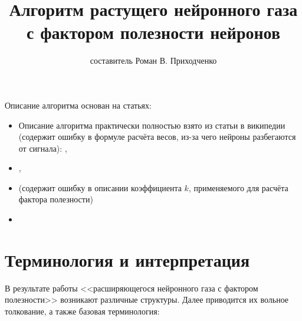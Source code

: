 \documentclass[unicode, 12pt, a4paper,oneside,fleqn]{article}
\author{составитель Роман В. Приходченко}
\title{Алгоритм растущего нейронного газа
  с фактором полезности нейронов}
\begin{document}
\renewcommand\bibname{СПИСОК ЛИТЕРАТУРЫ}
\renewcommand\refname{\centering Список литературы}
\renewcommand\contentsname{\centering Содержание}



\makeatletter %
\maketitle

\newpage
\tableofcontents

\newpage
Описание алгоритма основан на статьях:
\begin{itemize}
\item Описание алгоритма практически полностью взято из статьи в
  википедии (содержит ошибку в формуле расчёта весов, из-за чего
  нейроны разбегаются от сигнала): \cite[Нейронный
  газ]{ru.wikipedia.org},
\item \cite[A "Neural-Gas" Network Learns
  Topologies]{neural-gas-T.Martinetz-K.Schulten},
\item \cite[Растущий нейронный газ - реализация на языке
  программирования MQL5]{gng-subbotin} (содержит ошибку в описании
  коэффициента $k$, применяемого для расчёта фактора полезности)
  \item \cite[GNG-U]{gng-u-B.Fritzke}
\end{itemize}



\section{Терминология и интерпретация}
В результате работы <<расширяющегося нейронного газа с фактором
полезности>> возникают различные структуры. Далее приводится их
вольное толкование, а также базовая терминология:
\end{document}
